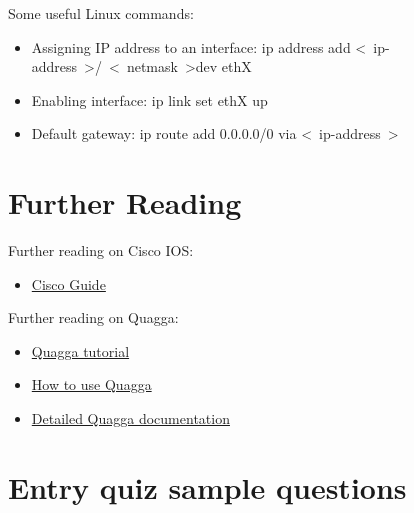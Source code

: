 \documentclass[a4paper]{article}
\begin{document}
Some useful Linux commands:

\begin{itemize}
    \item Assigning IP address to an interface: ip address add
          \textless~ip-address~\textgreater/~\textless~netmask~\textgreater dev ethX
    \item Enabling interface: ip link set ethX up
    \item Default gateway: ip route add 0.0.0.0/0 via \textless~ip-address~\textgreater
\end{itemize}

\section{Further Reading}\label{sec:further-reading}
Further reading on Cisco IOS:
\begin{itemize}
    \item \href{https://qosip.tmit.bme.hu/foswiki/pub/Meres/SwitchLinkekAggregalasaFeladatok/cisco_guide_en.doc}{Cisco
              Guide}
\end{itemize}

Further reading on Quagga:
\begin{itemize}
    \item \href{http://www.brianlinkletter.com/how-to-build-a-network-of-linux-routers-using-quagga/}{Quagga tutorial}
    \item \href{https://openmaniak.com/quagga_tutorial.php}{How to use Quagga}
    \item \href{http://downloads.pf.itd.nrl.navy.mil/docs/ospf-manet/quagga.pdf}{Detailed Quagga documentation}
\end{itemize}

\appendix

\section{Entry quiz sample questions}
\end{document}
